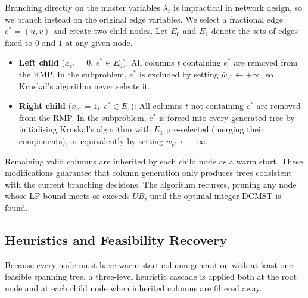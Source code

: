 \documentclass[12pt]{article}
\begin{document}
\medskip
\noindent 
Branching directly on the master variables $\lambda_t$ is impractical in network design, so we branch instead on the original edge variables. We select a fractional edge $e^* = (u,v)$ and create two child nodes. Let $E_0$ and $E_1$ denote the sets of edges fixed to $0$ and $1$ at any given node.
\begin{itemize}
    \item \textbf{Left child} ($x_{e^*} = 0$, $e^* \in E_0$): All columns $t$ containing $e^*$ are removed from the RMP. In the subproblem, $e^*$ is excluded by setting $\bar{w}_{e^*} \gets +\infty$, so Kruskal's algorithm never selects it.
    \item \textbf{Right child} ($x_{e^*} = 1$,\ $e^* \in E_1$): All columns $t$ not containing $e^*$ are removed from the RMP. In the subproblem, $e^*$ is forced into every generated tree by initialising Kruskal's algorithm with $E_1$ pre-selected (merging their components), or equivalently by setting $\bar{w}_{e^*} \gets -\infty$.
\end{itemize}
Remaining valid columns are inherited by each child node as a warm start. These modifications guarantee that column generation only produces trees consistent with the current branching decisions. The algorithm recurses, pruning any node whose LP bound meets or exceeds $UB$, until the optimal integer DCMST is found.

\subsection{Heuristics and Feasibility Recovery}

Because every node must have warm-start column generation with at least one feasible spanning tree, a three-level heuristic cascade is applied both at the root node and at each child node when inherited columns are filtered away.
\end{document}
